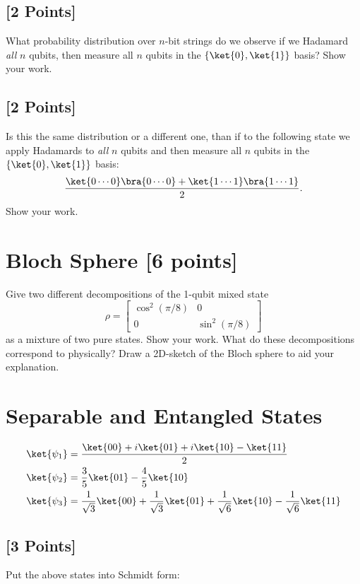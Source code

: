 \documentclass[11pt]{article}
\begin{document}
\subsection{[2 Points]} What probability distribution over $n$-bit strings do we observe if
we Hadamard \textit{all} $n$ qubits, then measure all $n$ qubits in the $\{\ket{0},\ket{1}\}$
basis? Show your work.


\subsection{[2 Points]} Is this the same distribution or a different one, than if to the following state we apply Hadamards to \textit{all} $n$ qubits and then measure all $n$ qubits in the $\{\ket{0},\ket{1}\}$
basis:
\[
\frac{\ket{0\cdots 0}\bra{0\cdots0} + \ket{1\cdots1}\bra{1\cdots1}}{2} .
\]
Show your work.

\section{Bloch Sphere [6 points]}

Give two different decompositions of the 1-qubit mixed state $$\rho = \begin{bmatrix}\cos^2(\pi/8) & 0\\ 0 & \sin^2(\pi/8)\end{bmatrix}$$ as a mixture of two pure states. Show your work. What do these decompositions correspond to physically?
Draw a 2D-sketch of the Bloch sphere to aid your explanation.

\section{Separable and Entangled States} 

\begin{align*}
\ket{\psi_1} & = \frac{\ket{00}+ i \ket{01} +  i \ket{10} - \ket{11} } {2}\\
\ket{\psi_2} & = \frac{3}{5} \ket{01} - \frac{4}{5} \ket{10}\\
\ket{\psi_3} & = \frac{1}{\sqrt{3}}\ket{00} + \frac{1}{\sqrt{3}} \ket{01} + \frac{1}{\sqrt{6}}\ket{10} -\frac{1}{\sqrt{6}} \ket{11}
\end{align*}

\subsection{[3 Points]} Put the above states into Schmidt form:
\end{document}
